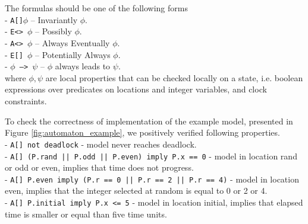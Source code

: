 \begin{definition}
The formulas should be one of the following forms\\
- \texttt{A[]$\phi$} -- Invariantly $\phi$.\\
- \texttt{E<> $\phi$} -- Possibly $\phi$.\\
- \texttt{A<> $\phi$} -- Always Eventually $\phi$.\\
- \texttt{E[] $\phi$} -- Potentially Always $\phi$.\\
- \texttt{$\phi$ --> $\psi$} -- $\phi$ always leads to $\psi$.\\
where $\phi, \psi$ are local properties that can be checked locally on a state, i.e. boolean expressions over predicates on locations and integer variables, and clock constraints.
\label{def:quantifiers}
\end{definition}
\noindent
To check the correctness of implementation of the example model, presented in Figure \ref{fig:automaton_example}, we positively verified following properties.\\
- \texttt{A[] not deadlock} - model never reaches deadlock.\\
- \texttt{A[] (P.rand || P.odd || P.even) imply P.x == 0} - model in location rand or odd or even, implies that time does not progress.\\
- \texttt{A[] P.even imply (P.r == 0 || P.r == 2 || P.r == 4)} -  model in location even, implies that the integer selected at random is equal to 0 or 2 or 4.\\
- \texttt{A[] P.initial imply P.x <= 5} - model in location initial, implies that elapsed time is smaller or equal than five time units.